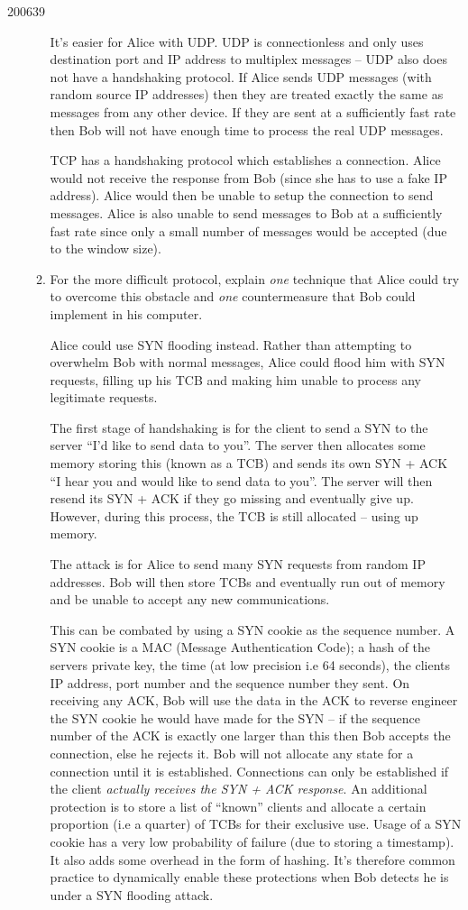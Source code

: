 \documentclass[10pt,\jkfside,a4paper]{article}
\begin{document}
\begin{examquestion}{2006}{3}{9}
\begin{enumerate}[label=(\alph*)]
\begin{enumerate}
It's easier for Alice with UDP\@. UDP is connectionless and only uses
destination port and IP address to multiplex messages -- UDP also does not
have a handshaking protocol. If Alice sends UDP messages (with random
source IP addresses) then they are treated exactly the same as messages
from any other device. If they are sent at a sufficiently fast rate then
Bob will not have enough time to process the real UDP messages.

TCP has a handshaking protocol which establishes a connection. Alice
would not receive the response from Bob (since she has to use a fake IP
address). Alice would then be unable to setup the connection to send
messages. Alice is also unable to send messages to Bob at a sufficiently
fast rate since only a small number of messages would be accepted (due to
the window size).

\item For the more difficult protocol, explain \textit{one} technique that
Alice could try to overcome this obstacle and \textit{one} countermeasure
that Bob could implement in his computer.

Alice could use SYN flooding instead. Rather than attempting to overwhelm
Bob with normal messages, Alice could flood him with SYN requests, filling
up his TCB and making him unable to process any legitimate requests.

The first stage of handshaking is for the client to send a SYN to the server
``I'd like to send data to you''. The server then allocates some memory
storing this (known as a TCB) and sends its own SYN + ACK ``I hear you and
would like to send data to you''. The server will then resend its SYN + ACK
if they go missing and eventually give up. However, during this process, the
TCB is still allocated -- using up memory.

The attack is for Alice to send many SYN requests from random IP addresses.
Bob will then store TCBs and eventually run out of memory and be unable to
accept any new communications.

This can be combated by using a SYN cookie as the sequence number. A SYN
cookie is a MAC (Message Authentication Code); a hash of the servers private
key, the time (at low precision i.e 64 seconds), the clients IP address,
port number and the sequence number they sent. On receiving any ACK, Bob
will use the data in the ACK to reverse engineer the SYN cookie he would
have made for the SYN -- if the sequence number of the ACK is exactly one
larger than this then Bob accepts the connection, else he rejects it. Bob
will not allocate any state for a connection until it is established.
Connections can only be established if the client \textit{actually receives
the SYN + ACK response}. An additional protection is to store a list of
``known'' clients and allocate a certain proportion (i.e a quarter) of TCBs
for their exclusive use. Usage of a SYN cookie has a very low probability
of failure (due to storing a timestamp). It also adds some overhead in the
form of hashing. It's therefore common practice to dynamically enable these
protections when Bob detects he is under a SYN flooding attack.


\end{enumerate}
\end{enumerate}
\end{examquestion}
\end{document}
